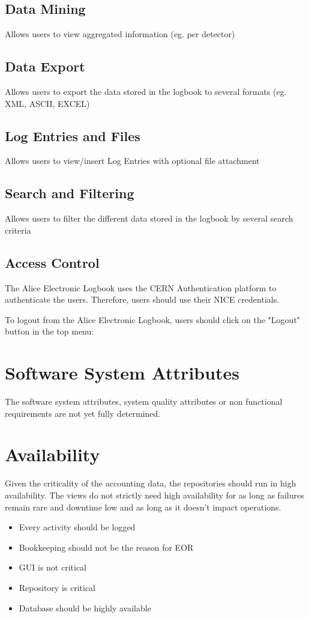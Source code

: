 \documentclass[a4paper,11pt]{book}
\begin{document}
\subsection{Data Mining}
Allows users to view aggregated information (eg. per detector)
\subsection{Data Export}
Allows users to export the data stored in the logbook to several formats (eg. XML, ASCII, EXCEL)
\subsection{Log Entries and Files}
Allows users to view/insert Log Entries with optional file attachment
\subsection{Search and Filtering}
Allows users to filter the different data stored in the logbook by several search criteria
\subsection{Access Control}
The Alice Electronic Logbook uses the CERN Authentication platform to authenticate the users. Therefore, users should use their NICE credentials.

To logout from the Alice Electronic Logbook, users should click on the "Logout" button in the top menu:
\section{Software System Attributes}
The software system attributes, system quality attributes or non functional requirements are not yet fully determined. 




\section{Availability}
Given the criticality of the accounting data, the repositories should run in high availability. The views do not strictly need high availability for as long as failures remain rare and downtime low and as long as it doesn’t impact operations.

\begin{itemize}
  \item Every activity should be logged
  \item Bookkeeping should not be the reason for EOR
  \item GUI is not critical
  \item Repository is critical
  \item Database should be highly available
\end{itemize}
\end{document}
